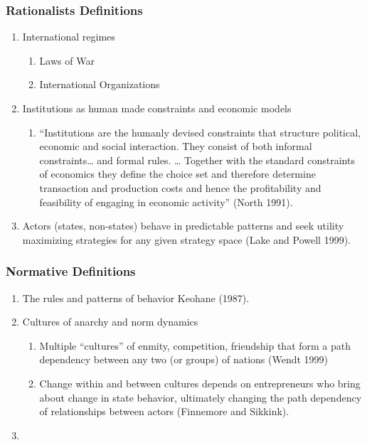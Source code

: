 \documentclass[11pt]{article}
\begin{document}
\subsubsection{Rationalists Definitions}
\label{sec-1-5-1}
\begin{enumerate}
\item International regimes
\begin{enumerate}
\item Laws of War
\item International Organizations
\end{enumerate}
\item Institutions as human made constraints and economic models
\begin{enumerate}
\item ``Institutions are the humanly devised constraints that structure
political, economic and social interaction. They consist of both
informal constraints\ldots{} and formal rules. \ldots{} Together with the
standard constraints of economics they define the choice set and
therefore determine transaction and production costs and hence
the profitability and feasibility of engaging in economic
activity'' (North 1991).
\end{enumerate}
\item Actors (states, non-states) behave in predictable patterns and seek
utility maximizing strategies for any given strategy space (Lake
and Powell 1999).
\end{enumerate}


\subsubsection{Normative Definitions}
\label{sec-1-5-2}
\begin{enumerate}
\item The rules and patterns of behavior Keohane (1987).
\item Cultures of anarchy and norm dynamics
\begin{enumerate}
\item Multiple ``cultures'' of enmity, competition, friendship that form
a path dependency between any two (or groups) of nations (Wendt 1999)
\item Change within and between cultures depends on entrepreneurs who
bring about change in state behavior, ultimately changing the
path dependency of relationships between actors (Finnemore and Sikkink).
\end{enumerate}
\item 
\end{enumerate}
\end{document}

